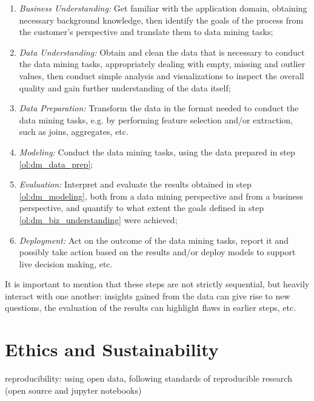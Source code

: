 \documentclass[a4paper]{book}
\begin{document}
\begin{enumerate}
\item \emph{Business Understanding:} Get familiar with the application domain, obtaining necessary background knowledge, then identify the goals of the process from the customer's perspective and translate them to data mining tasks;
\label{ol:dm_biz_understanding}

\item \emph{Data Understanding:} Obtain and clean the data that is necessary to conduct the data mining tasks, appropriately dealing with empty, missing and outlier values, then conduct simple analysis and visualizations to inspect the overall quality and gain further understanding of the data itself;
\label{ol:dm_data_understanding}

\item \emph{Data Preparation:} Transform the data in the format needed to conduct the data mining tasks, e.g. by performing feature selection and/or extraction, such as joins, aggregates, etc.
\label{ol:dm_data_prep}

\item \emph{Modeling:} Conduct the data mining tasks, using the data prepared in step \ref{ol:dm_data_prep};
\label{ol:dm_modeling}

\item \emph{Evaluation:} Interpret and evaluate the results obtained in step \ref{ol:dm_modeling}, both from a data mining perspective and from a business perspective, and quantify to what extent the goals defined in step \ref{ol:dm_biz_understanding} were achieved;
\label{ol:dm_eval}

\item \emph{Deployment:} Act on the outcome of the data mining tasks, report it and possibly take action based on the results and/or deploy models to support live decision making, etc.
\label{ol:deploy}
\end{enumerate}

It is important to mention that these steps are not strictly sequential, but heavily interact with one another: insights gained from the data can give rise to new questions, the evaluation of the results can highlight flaws in earlier steps, etc.

\section{Ethics and Sustainability}
reproducibility: using open data, following standards of reproducible research (open source and jupyter notebooks)
\end{document}
